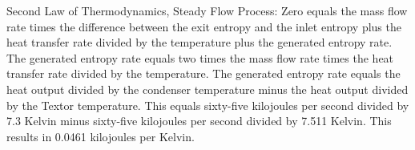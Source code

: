 Second Law of Thermodynamics, Steady Flow Process:
Zero equals the mass flow rate times the difference between the exit entropy and the inlet entropy plus the heat transfer rate divided by the temperature plus the generated entropy rate.
The generated entropy rate equals two times the mass flow rate times the heat transfer rate divided by the temperature.
The generated entropy rate equals the heat output divided by the condenser temperature minus the heat output divided by the Textor temperature.
This equals sixty-five kilojoules per second divided by 7.3 Kelvin minus sixty-five kilojoules per second divided by 7.511 Kelvin.
This results in 0.0461 kilojoules per Kelvin.